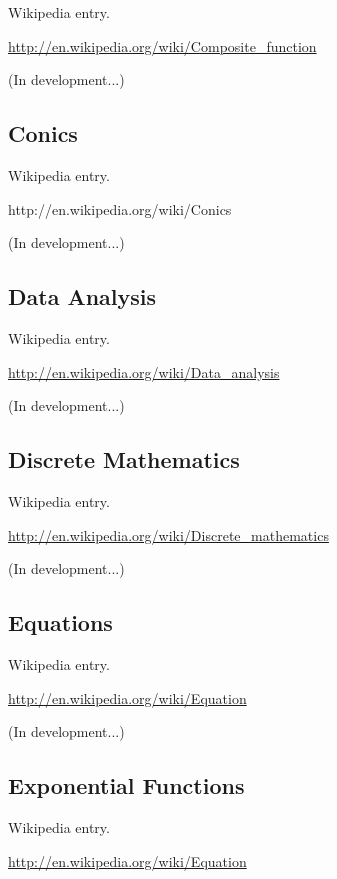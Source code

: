 \documentclass[12pt,oneside]{book}
\begin{document}
Wikipedia entry.

\href{http://en.wikipedia.org/wiki/Composite_function}{http://en.wikipedia.org/wiki/Composite\_function}

(In development...)

\subsection[Conics]{Conics}

Wikipedia entry.

http://en.wikipedia.org/wiki/Conics

(In development...)

\subsection[Data Analysis]{Data Analysis}

Wikipedia entry.

\href{http://en.wikipedia.org/wiki/Data_analysis}{http://en.wikipedia.org/wiki/Data\_analysis}

(In development...)

\subsection[Discrete Mathematics]{Discrete Mathematics}

Wikipedia entry.

\href{http://en.wikipedia.org/wiki/Discrete_mathematics}{http://en.wikipedia.org/wiki/Discrete\_mathematics}

(In development...)

\subsection[Equations]{Equations}

Wikipedia entry.

\href{http://en.wikipedia.org/wiki/Equation}{http://en.wikipedia.org/wiki/Equation}

(In development...)

\subsection[Exponential Functions]{Exponential Functions}

Wikipedia entry.

\href{http://en.wikipedia.org/wiki/Equation}{http://en.wikipedia.org/wiki/Equation}
\end{document}
